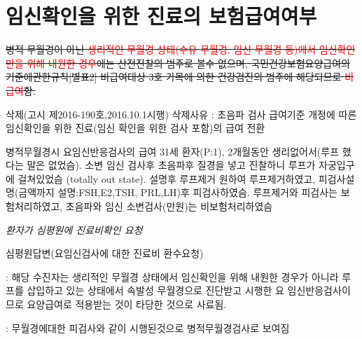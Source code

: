 \section{임신확인을 위한 진료의 보험급여여부}
{
\sout{병적 무월경이 아닌 \textcolor{red}{생리적인 무월경 상태(수유 무월경, 임신 무월경 등)에서 임신확인만을 위해 내원한 경우}에는 산전진찰의 범주로 볼수 없으며, 국민건강보험요양급여의기준에관한규칙[별표2] 비급여대상 3호 가목에 의한 건강검진의 범주에 해당되므로 \textcolor{red}{비급여}함.}\par
삭제(고시 제2016-190호,2016.10.1시행) 삭제사유 : 초음파 검사 급여기준 개정에 따른 임신확인을 위한 진료(임신 확인을 위한 검사 포함)의 급여 전환
}
\par
\medskip
{}

\par
\medskip
\begin{commentbox}{병적무월경시 요임신반응검사의 급여}
31세 환자(P:1), 2개월동안 생리없어서(루프 했다는 말은 없었슴). 소변 임신 검사후 초음파후 질경을 넣고 진찰하니 루프가 자궁입구에 걸쳐있었슴 (totally out state). 설명후 루프제거 원하여 루프제거하였고, 피검사설명(금액까지 설명:FSH,E2,TSH, PRL,LH)후 피검사하였슴. 루프제거와 피검사는 보험처리하였고, 초음파와 임신 소변검사(만원)는 비보험처리하였슴\par

\begin{center}\emph{환자가 심평원에 진료비확인 요청}\end{center}\par
심평원답변(요임신검사에 대한 진료비 환수요청) \par
: 해당 수진자는 생리적인 무월경 상태에서 임신확인을 위해 내원한 경우가 아니라 루프를 삽입하고 있는 상태에서 속발성 무월경으로 진단받고 시행한 요 임신반응검사이므로 요양급여로 적용받는 것이 타당한 것으로 사료됨. \par
: 무월경에대한 피검사와 같이 시행된것으로 병적무월경검사로 보여짐
\end{commentbox}

